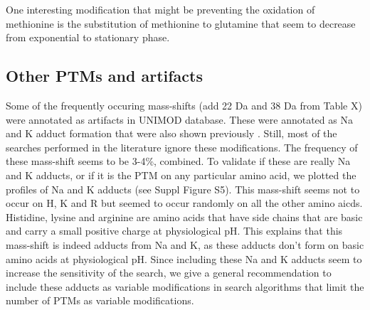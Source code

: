 \documentclass[12pt]{article}
\begin{document}
One interesting modification that might be preventing the oxidation of methionine is the substitution of methionine to glutamine that seem to decrease from exponential to stationary phase.

\subsection{Other PTMs and artifacts}

Some of the frequently occuring mass-shifts (add 22 Da and 38 Da from Table X) were annotated as artifacts in UNIMOD database. These were annotated as Na and K adduct formation that were also shown previously \cite{SchugMcNair2003}. Still, most of the searches performed in the literature ignore these modifications. The frequency of these mass-shift seems to be 3-4\%, combined. To validate if these are really Na and K adducts, or if it is the PTM on any particular amino acid, we plotted the profiles of Na and K adducts (see Suppl Figure S5). This mass-shift seems not to occur on H, K and R but seemed to occur randomly on all the other amino aicds. Histidine, lysine and arginine are amino acids that have side chains that are basic and carry a small positive charge at physiological pH. This explains that this mass-shift is indeed adducts from Na and K, as these adducts don't form on basic amino acids at physiological pH. Since including these Na and K adducts seem to increase the sensitivity of the search, we give a general recommendation to include these adducts as variable modifications in search algorithms that limit the number of PTMs as variable modifications. 
\end{document}
